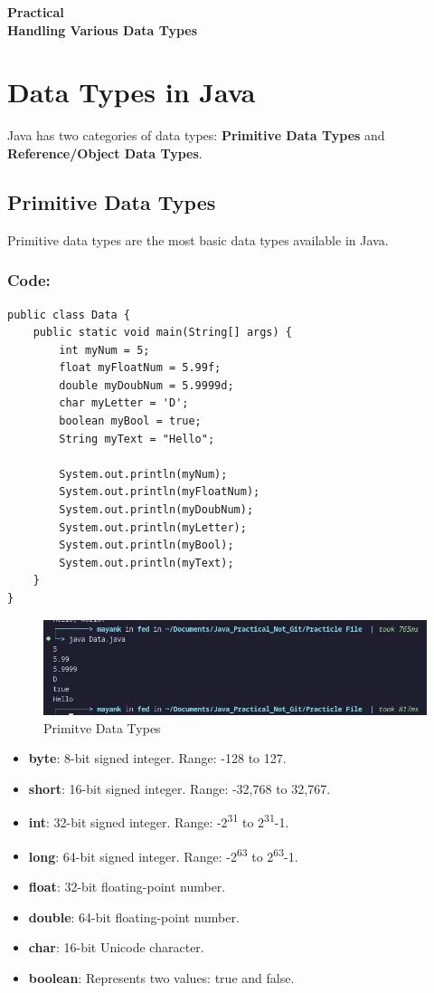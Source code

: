 \documentclass[a4paper,12pt]{article}
\newcounter{practicalno} %
\newcommand{\practicaltitle}[1]{
    \stepcounter{practicalno} %
    \newpage
    \begin{center}
        \vspace{1cm}
        \Large\textbf{Practical \thepracticalno} \\
        \vspace{0.5cm}
        \Large\textbf{#1} %
        \normalsize\vspace{1cm}
    \end{center}
}
\begin{document}
\setcounter{section}{0}
\practicaltitle{Handling Various Data Types}

\section{Data Types in Java}
Java has two categories of data types: \textbf{Primitive Data Types} and \textbf{Reference/Object Data Types}.

\subsection{Primitive Data Types}
Primitive data types are the most basic data types available in Java.
\subsubsection{Code: }
\begin{lstlisting}
public class Data {
    public static void main(String[] args) {
        int myNum = 5;               
        float myFloatNum = 5.99f;
        double myDoubNum = 5.9999d;  
        char myLetter = 'D';        
        boolean myBool = true;       
        String myText = "Hello";     

        System.out.println(myNum);
        System.out.println(myFloatNum);
        System.out.println(myDoubNum);
        System.out.println(myLetter);
        System.out.println(myBool);
        System.out.println(myText);
    }
}
\end{lstlisting}

\begin{figure}[H]
    \centering
    \includegraphics[width=0.9\linewidth]{images/DataOutput.png}
    \caption{Primitve Data Types}
    \label{fig:sample_image}
\end{figure}

\begin{itemize}[leftmargin=2cm]
    \item \textbf{byte}: 8-bit signed integer. Range: -128 to 127.
    \item \textbf{short}: 16-bit signed integer. Range: -32,768 to 32,767.
    \item \textbf{int}: 32-bit signed integer. Range: -2\textsuperscript{31} to 2\textsuperscript{31}-1.
    \item \textbf{long}: 64-bit signed integer. Range: -2\textsuperscript{63} to 2\textsuperscript{63}-1.
    \item \textbf{float}: 32-bit floating-point number.
    \item \textbf{double}: 64-bit floating-point number.
    \item \textbf{char}: 16-bit Unicode character.
    \item \textbf{boolean}: Represents two values: true and false.
\end{itemize}
\end{document}
